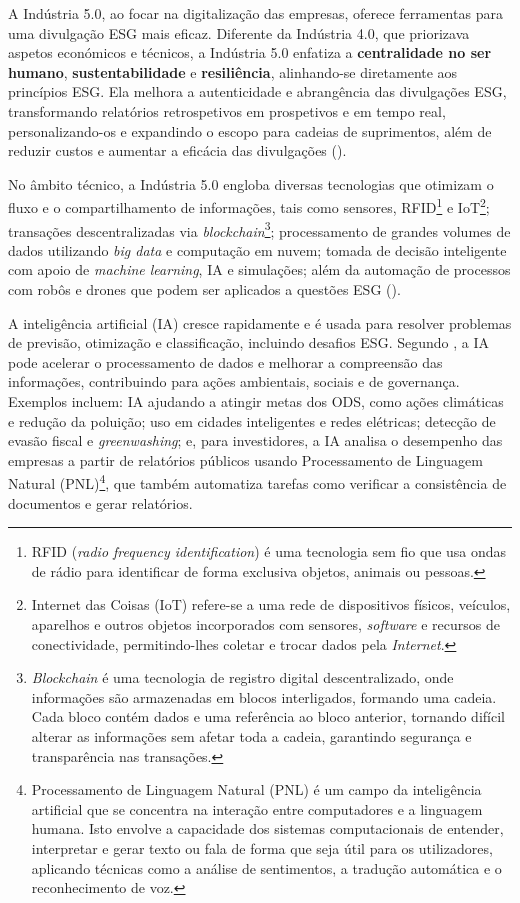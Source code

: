 A Indústria 5.0, ao focar na digitalização das empresas, oferece ferramentas para uma divulgação ESG mais eficaz. Diferente da Indústria 4.0, que priorizava aspetos económicos e técnicos, a Indústria 5.0 enfatiza a \textbf{centralidade no ser humano}, \textbf{sustentabilidade} e \textbf{resiliência}, alinhando-se diretamente aos princípios ESG. Ela melhora a autenticidade e abrangência das divulgações ESG, transformando relatórios retrospetivos em prospetivos e em tempo real, personalizando-os e expandindo o escopo para cadeias de suprimentos, além de reduzir custos e aumentar a eficácia das divulgações (\cite{Asif2023}).

No âmbito técnico, a Indústria 5.0 engloba diversas tecnologias que otimizam o fluxo e o compartilhamento de informações, tais como sensores, RFID\footnote{RFID (\textit{radio frequency identification}) é uma tecnologia sem fio que usa ondas de rádio para identificar de forma exclusiva objetos, animais ou pessoas.} e IoT\footnote{Internet das Coisas (IoT) refere-se a uma rede de dispositivos físicos, veículos, aparelhos e outros objetos incorporados com sensores, \textit{software} e recursos de conectividade, permitindo-lhes coletar e trocar dados pela \textit{Internet}.}; transações descentralizadas via \textit{blockchain}\footnote{\textit{Blockchain} é uma tecnologia de registro digital descentralizado, onde informações são armazenadas em blocos interligados, formando uma cadeia. Cada bloco contém dados e uma referência ao bloco anterior, tornando difícil alterar as informações sem afetar toda a cadeia, garantindo segurança e transparência nas transações.}; processamento de grandes volumes de dados utilizando \textit{big data} e computação em nuvem; tomada de decisão inteligente com apoio de \textit{machine learning}, IA e simulações; além da automação de processos com robôs e drones que podem ser aplicados a questões ESG (\cite{Asif2023}).

A inteligência artificial (IA) cresce rapidamente e é usada para resolver problemas de previsão, otimização e classificação, incluindo desafios ESG. Segundo \cite{Burnaev2023}, a IA pode acelerar o processamento de dados e melhorar a compreensão das informações, contribuindo para ações ambientais, sociais e de governança. Exemplos incluem: IA ajudando a atingir metas dos ODS, como ações climáticas e redução da poluição; uso em cidades inteligentes e redes elétricas; detecção de evasão fiscal e \textit{greenwashing}; e, para investidores, a IA analisa o desempenho das empresas a partir de relatórios públicos usando Processamento de Linguagem Natural (PNL)\footnote{Processamento de Linguagem Natural (PNL) é um campo da inteligência artificial que se concentra na interação entre computadores e a linguagem humana. Isto envolve a capacidade dos sistemas computacionais de entender, interpretar e gerar texto ou fala de forma que seja útil para os utilizadores, aplicando técnicas como a análise de sentimentos, a tradução automática e o reconhecimento de voz.}, que também automatiza tarefas como verificar a consistência de documentos e gerar relatórios.

